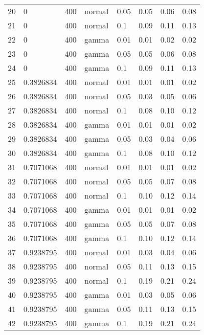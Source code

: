 \begin{table}[ht]
\begin{tabular}{rllllrrr}
  20 & 0 & 400 & normal & 0.05 & 0.05 & 0.06 & 0.08 \\ 
  21 & 0 & 400 & normal & 0.1 & 0.09 & 0.11 & 0.13 \\ 
  22 & 0 & 400 & gamma & 0.01 & 0.01 & 0.02 & 0.02 \\ 
  23 & 0 & 400 & gamma & 0.05 & 0.05 & 0.06 & 0.08 \\ 
  24 & 0 & 400 & gamma & 0.1 & 0.09 & 0.11 & 0.13 \\ 
  25 & 0.3826834 & 400 & normal & 0.01 & 0.01 & 0.01 & 0.02 \\ 
  26 & 0.3826834 & 400 & normal & 0.05 & 0.03 & 0.05 & 0.06 \\ 
  27 & 0.3826834 & 400 & normal & 0.1 & 0.08 & 0.10 & 0.12 \\ 
  28 & 0.3826834 & 400 & gamma & 0.01 & 0.01 & 0.01 & 0.02 \\ 
  29 & 0.3826834 & 400 & gamma & 0.05 & 0.03 & 0.04 & 0.06 \\ 
  30 & 0.3826834 & 400 & gamma & 0.1 & 0.08 & 0.10 & 0.12 \\ 
  31 & 0.7071068 & 400 & normal & 0.01 & 0.01 & 0.01 & 0.02 \\ 
  32 & 0.7071068 & 400 & normal & 0.05 & 0.05 & 0.07 & 0.08 \\ 
  33 & 0.7071068 & 400 & normal & 0.1 & 0.10 & 0.12 & 0.14 \\ 
  34 & 0.7071068 & 400 & gamma & 0.01 & 0.01 & 0.01 & 0.02 \\ 
  35 & 0.7071068 & 400 & gamma & 0.05 & 0.05 & 0.07 & 0.08 \\ 
  36 & 0.7071068 & 400 & gamma & 0.1 & 0.10 & 0.12 & 0.14 \\ 
  37 & 0.9238795 & 400 & normal & 0.01 & 0.03 & 0.04 & 0.06 \\ 
  38 & 0.9238795 & 400 & normal & 0.05 & 0.11 & 0.13 & 0.15 \\ 
  39 & 0.9238795 & 400 & normal & 0.1 & 0.19 & 0.21 & 0.24 \\ 
  40 & 0.9238795 & 400 & gamma & 0.01 & 0.03 & 0.05 & 0.06 \\ 
  41 & 0.9238795 & 400 & gamma & 0.05 & 0.11 & 0.13 & 0.15 \\ 
  42 & 0.9238795 & 400 & gamma & 0.1 & 0.19 & 0.21 & 0.24 \\ 
   \hline
\end{tabular}
\end{table}

